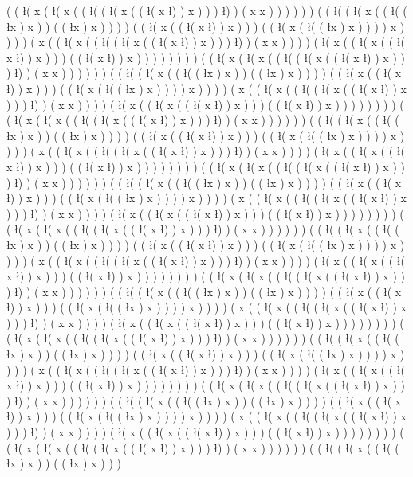  ( ( \l ( x ( \l ( x ( ( \l ( ( \l ( x ( ( \l ( x \l ) ) x ) ) ) \l ) ) ( x x ) ) ) ) ) ) ( ( \l ( ( \l ( x ( ( \l ( ( \l x ) x ) ) ( ( \l x ) x ) ) ) ) ( ( \l ( x ( ( \l ( x \l ) ) x ) ) ) ( ( \l ( x ( \l ( ( \l x ) x ) ) ) ) x ) ) ) ) ( x ( ( \l ( x ( ( \l ( ( \l ( x ( ( \l ( x \l ) ) x ) ) ) \l ) ) ( x x ) ) ) ) ( \l ( x ( ( \l ( x ( ( \l ( x \l ) ) x ) ) ) ( ( \l ( x \l ) ) x ) ) ) ) ) ) ) ) ( ( \l ( x ( \l ( x ( ( \l ( ( \l ( x ( ( \l ( x \l ) ) x ) ) ) \l ) ) ( x x ) ) ) ) ) ) ( ( \l ( ( \l ( x ( ( \l ( ( \l x ) x ) ) ( ( \l x ) x ) ) ) ) ( ( \l ( x ( ( \l ( x \l ) ) x ) ) ) ( ( \l ( x ( \l ( ( \l x ) x ) ) ) ) x ) ) ) ) ( x ( ( \l ( x ( ( \l ( ( \l ( x ( ( \l ( x \l ) ) x ) ) ) \l ) ) ( x x ) ) ) ) ( \l ( x ( ( \l ( x ( ( \l ( x \l ) ) x ) ) ) ( ( \l ( x \l ) ) x ) ) ) ) ) ) ) ) ( ( \l ( x ( \l ( x ( ( \l ( ( \l ( x ( ( \l ( x \l ) ) x ) ) ) \l ) ) ( x x ) ) ) ) ) ) ( ( \l ( ( \l ( x ( ( \l ( ( \l x ) x ) ) ( ( \l x ) x ) ) ) ) ( ( \l ( x ( ( \l ( x \l ) ) x ) ) ) ( ( \l ( x ( \l ( ( \l x ) x ) ) ) ) x ) ) ) ) ( x ( ( \l ( x ( ( \l ( ( \l ( x ( ( \l ( x \l ) ) x ) ) ) \l ) ) ( x x ) ) ) ) ( \l ( x ( ( \l ( x ( ( \l ( x \l ) ) x ) ) ) ( ( \l ( x \l ) ) x ) ) ) ) ) ) ) ) ( ( \l ( x ( \l ( x ( ( \l ( ( \l ( x ( ( \l ( x \l ) ) x ) ) ) \l ) ) ( x x ) ) ) ) ) ) ( ( \l ( ( \l ( x ( ( \l ( ( \l x ) x ) ) ( ( \l x ) x ) ) ) ) ( ( \l ( x ( ( \l ( x \l ) ) x ) ) ) ( ( \l ( x ( \l ( ( \l x ) x ) ) ) ) x ) ) ) ) ( x ( ( \l ( x ( ( \l ( ( \l ( x ( ( \l ( x \l ) ) x ) ) ) \l ) ) ( x x ) ) ) ) ( \l ( x ( ( \l ( x ( ( \l ( x \l ) ) x ) ) ) ( ( \l ( x \l ) ) x ) ) ) ) ) ) ) ) ( ( \l ( x ( \l ( x ( ( \l ( ( \l ( x ( ( \l ( x \l ) ) x ) ) ) \l ) ) ( x x ) ) ) ) ) ) ( ( \l ( ( \l ( x ( ( \l ( ( \l x ) x ) ) ( ( \l x ) x ) ) ) ) ( ( \l ( x ( ( \l ( x \l ) ) x ) ) ) ( ( \l ( x ( \l ( ( \l x ) x ) ) ) ) x ) ) ) ) ( x ( ( \l ( x ( ( \l ( ( \l ( x ( ( \l ( x \l ) ) x ) ) ) \l ) ) ( x x ) ) ) ) ( \l ( x ( ( \l ( x ( ( \l ( x \l ) ) x ) ) ) ( ( \l ( x \l ) ) x ) ) ) ) ) ) ) ) ( ( \l ( x ( \l ( x ( ( \l ( ( \l ( x ( ( \l ( x \l ) ) x ) ) ) \l ) ) ( x x ) ) ) ) ) ) ( ( \l ( ( \l ( x ( ( \l ( ( \l x ) x ) ) ( ( \l x ) x ) ) ) ) ( ( \l ( x ( ( \l ( x \l ) ) x ) ) ) ( ( \l ( x ( \l ( ( \l x ) x ) ) ) ) x ) ) ) ) ( x ( ( \l ( x ( ( \l ( ( \l ( x ( ( \l ( x \l ) ) x ) ) ) \l ) ) ( x x ) ) ) ) ( \l ( x ( ( \l ( x ( ( \l ( x \l ) ) x ) ) ) ( ( \l ( x \l ) ) x ) ) ) ) ) ) ) ) ( ( \l ( x ( \l ( x ( ( \l ( ( \l ( x ( ( \l ( x \l ) ) x ) ) ) \l ) ) ( x x ) ) ) ) ) ) ( ( \l ( ( \l ( x ( ( \l ( ( \l x ) x ) ) ( ( \l x ) x ) ) ) ) ( ( \l ( x ( ( \l ( x \l ) ) x ) ) ) ( ( \l ( x ( \l ( ( \l x ) x ) ) ) ) x ) ) ) ) ( x ( ( \l ( x ( ( \l ( ( \l ( x ( ( \l ( x \l ) ) x ) ) ) \l ) ) ( x x ) ) ) ) ( \l ( x ( ( \l ( x ( ( \l ( x \l ) ) x ) ) ) ( ( \l ( x \l ) ) x ) ) ) ) ) ) ) ) ( ( \l ( x ( \l ( x ( ( \l ( ( \l ( x ( ( \l ( x \l ) ) x ) ) ) \l ) ) ( x x ) ) ) ) ) ) ( ( \l ( ( \l ( x ( ( \l ( ( \l x ) x ) ) ( ( \l x ) x ) ) ) ) ( ( \l ( x ( ( \l ( x \l ) ) x ) ) ) ( ( \l ( x ( \l ( ( \l x ) x ) ) ) ) x ) ) ) ) ( x ( ( \l ( x ( ( \l ( ( \l ( x ( ( \l ( x \l ) ) x ) ) ) \l ) ) ( x x ) ) ) ) ( \l ( x ( ( \l ( x ( ( \l ( x \l ) ) x ) ) ) ( ( \l ( x \l ) ) x ) ) ) ) ) ) ) ) ( ( \l ( x ( \l ( x ( ( \l ( ( \l ( x ( ( \l ( x \l ) ) x ) ) ) \l ) ) ( x x ) ) ) ) ) ) ( ( \l ( ( \l ( x ( ( \l ( ( \l x ) x ) ) ( ( \l x ) x ) ) ) 